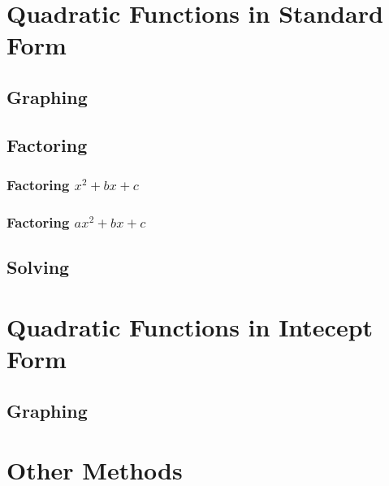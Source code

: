 \documentclass[]{book}
\begin{document}
\hypertarget{quadratic-functions-in-standard-form}{%
\section{Quadratic Functions in Standard Form}\label{quadratic-functions-in-standard-form}}

\hypertarget{graphing-1}{%
\subsection{Graphing}\label{graphing-1}}

\hypertarget{factoring}{%
\subsection{Factoring}\label{factoring}}

\hypertarget{factoring-x2bxc}{%
\subsubsection{\texorpdfstring{Factoring \(x^2+bx+c\)}{Factoring x\^{}2+bx+c}}\label{factoring-x2bxc}}

\hypertarget{factoring-ax2bxc}{%
\subsubsection{\texorpdfstring{Factoring \(ax^2+bx+c\)}{Factoring ax\^{}2+bx+c}}\label{factoring-ax2bxc}}

\hypertarget{solving-1}{%
\subsection{Solving}\label{solving-1}}

\hypertarget{quadratic-functions-in-intecept-form}{%
\section{Quadratic Functions in Intecept Form}\label{quadratic-functions-in-intecept-form}}

\hypertarget{graphing-2}{%
\subsection{Graphing}\label{graphing-2}}

\hypertarget{other-methods}{%
\section{Other Methods}\label{other-methods}}
\end{document}
